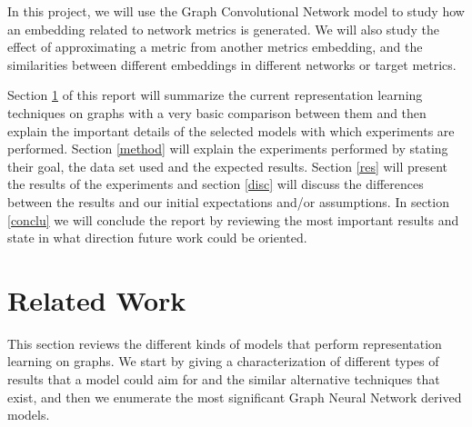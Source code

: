 \documentclass[a4paper]{article}
\begin{document}
In this project, we will use the Graph Convolutional Network model to study how an embedding related to network  metrics is generated. We will also study the effect of approximating a metric from another metrics embedding, and the similarities between different embeddings in different networks or target metrics.

Section \ref{rw} of this report will summarize the current representation learning techniques on graphs with a very basic comparison between them and then explain the important details of the selected models with which experiments are performed. Section \ref{method} will explain the experiments performed by stating their goal, the data set used and the expected results. Section \ref{res} will present the results of the experiments and section \ref{disc} will discuss the differences between the results and our initial expectations and/or assumptions. In section \ref{conclu} we will conclude the report by reviewing the most important results and state in what direction future work could be oriented.


\section{Related Work} \label{rw}

This section reviews the different kinds of models that perform representation learning on graphs. We start by giving a characterization of different types of results that a model could aim for and the similar alternative techniques that exist, and then we enumerate the most significant Graph Neural Network derived models. 
\end{document}
